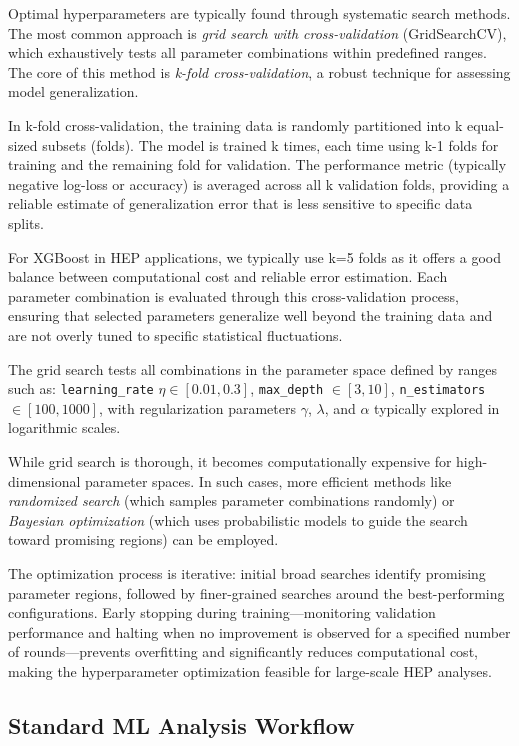 Optimal hyperparameters are typically found through systematic search methods. The most common approach is \textit{grid search with cross-validation} (GridSearchCV), which exhaustively tests all parameter combinations within predefined ranges. The core of this method is \textit{k-fold cross-validation}, a robust technique for assessing model generalization. 

In k-fold cross-validation, the training data is randomly partitioned into k equal-sized subsets (folds). The model is trained k times, each time using k-1 folds for training and the remaining fold for validation. The performance metric (typically negative log-loss or accuracy) is averaged across all k validation folds, providing a reliable estimate of generalization error that is less sensitive to specific data splits.

For XGBoost in HEP applications, we typically use k=5 folds as it offers a good balance between computational cost and reliable error estimation. Each parameter combination is evaluated through this cross-validation process, ensuring that selected parameters generalize well beyond the training data and are not overly tuned to specific statistical fluctuations.

The grid search tests all combinations in the parameter space defined by ranges such as: \texttt{learning\_rate} $\eta \in [0.01, 0.3]$, \texttt{max\_depth} $\in [3, 10]$, \texttt{n\_estimators} $\in [100, 1000]$, with regularization parameters $\gamma$, $\lambda$, and $\alpha$ typically explored in logarithmic scales.

While grid search is thorough, it becomes computationally expensive for high-dimensional parameter spaces. In such cases, more efficient methods like \textit{randomized search} (which samples parameter combinations randomly) or \textit{Bayesian optimization} (which uses probabilistic models to guide the search toward promising regions) can be employed. 

The optimization process is iterative: initial broad searches identify promising parameter regions, followed by finer-grained searches around the best-performing configurations. Early stopping during training—monitoring validation performance and halting when no improvement is observed for a specified number of rounds—prevents overfitting and significantly reduces computational cost, making the hyperparameter optimization feasible for large-scale HEP analyses.

\subsection{Standard ML Analysis Workflow}
\label{ssec:ml_workflow}

